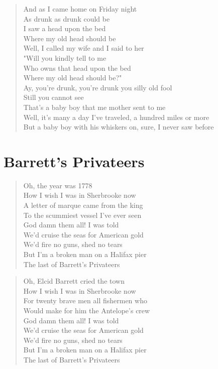 \documentclass[8pt,twoside]{extarticle}
\newenvironment{xverse}{
	\interlinepenalty 10000
	\begin{verse}
	\begin{minipage}{\linewidth}
	\parskip 5pt
	\vspace{-6pt}
	}
	{
	\end{minipage}
	\end{verse}
	\penalty 0
	\vspace{-6pt}
	}
\begin{document}
\begin{xverse}
And as I came home on Friday night \\
As drunk as drunk could be \\
I saw a head upon the bed \\
Where my old head should be \\
Well, I called my wife and I said to her \\
"Will you kindly tell to me \\
Who owns that head upon the bed \\
Where my old head should be?" \\
Ay, you're drunk, you're drunk you silly old fool \\
Still you cannot see \\
That's a baby boy that me mother sent to me \\
Well, it's many a day I've traveled, a hundred miles or more \\
But a baby boy with his whiskers on, sure, I never saw before \\
\end{xverse}

\section{Barrett's Privateers}

\begin{xverse}
Oh, the year was 1778 \\
How I wish I was in Sherbrooke now \\
A letter of marque came from the king \\
To the scummiest vessel I've ever seen \\
God damn them all! I was told \\
We'd cruise the seas for American gold \\
We'd fire no guns, shed no tears \\
But I'm a broken man on a Halifax pier \\
The last of Barrett's Privateers \\
\end{xverse}

\begin{xverse}
Oh, Elcid Barrett cried the town \\
How I wish I was in Sherbrooke now \\
For twenty brave men all fishermen who \\
Would make for him the Antelope's crew \\
God damn them all! I was told \\
We'd cruise the seas for American gold \\
We'd fire no guns, shed no tears \\
But I'm a broken man on a Halifax pier \\
The last of Barrett's Privateers \\
\end{xverse}
\end{document}
